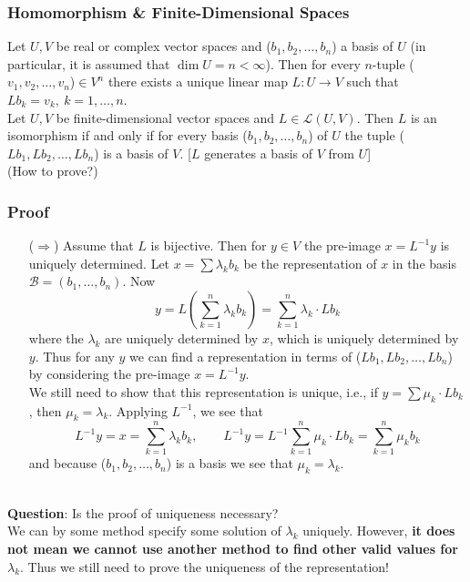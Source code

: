 \documentclass[12pt, t]{beamer}
\newcommand{\myseries}[2]{$#1_1,#1_2,\dots,#1_#2$}
\newcommand{\nullspace}{~\\[15pt]}
\begin{document}
\begin{frame}
    \frametitle{Homomorphism \& Finite-Dimensional Spaces}
    Let $U,V$ be real or complex vector spaces and (\myseries{b}{n}) a basis of $U$ (in particular, it is assumed that $\dim U=n<\infty$). Then for every $n$-tuple (\myseries{v}{n})$\in V^n$ there exists a unique linear map $L:U\to V$ such that $Lb_k=v_k,~k=1,\ldots,n.$
    \nullspace
    Let $U,V$ be finite-dimensional vector spaces and $L\in\mathcal{L}(U,V)$. Then $L$ is an isomorphism if and only if for every basis (\myseries{b}{n}) of $U$ the tuple (\myseries{Lb}{n}) is a basis of $V$. [$L$ generates a basis of $V$ from $U$]
    \nullspace
    (How to prove?)
\end{frame}

\begin{frame}
    \frametitle{Proof}
    \tiny
    \begin{itemize}
        \item[($\Rightarrow$)] Assume that $L$ is bijective. Then for $y\in V$ the pre-image $x=L^{-1}y$ is uniquely determined. Let $x=\sum\lambda_kb_k$ be the representation of $x$ in the basis $\mathcal{B}=(b_1,\ldots,b_n)$. Now
              \[y=L\left(\sum_{k=1}^{n}\lambda_kb_k\right)=\sum_{k=1}^{n}\lambda_k\cdot Lb_k\]
              where the $\lambda_k$ are uniquely determined by $x$, which is uniquely determined by $y$. Thus for any $y$ we can find a representation in terms of (\myseries{Lb}{n}) by considering the pre-image $x=L^{-1}y$.\\
              We still need to show that this representation is unique, i.e., if $y=\sum\mu_k\cdot Lb_k$, then $\mu_k=\lambda_k$. Applying $L^{-1}$, we see that
              \[L^{-1}y=x=\sum_{k=1}^{n}\lambda_kb_k,\qquad
                  L^{-1}y=L^{-1}\sum_{k=1}^{n}\mu_k\cdot Lb_k=\sum_{k=1}^{n}\mu_kb_k\]
              and because (\myseries{b}{n}) is a basis we see that $\mu_k=\lambda_k$.
    \end{itemize}
    \nullspace \small
    \textbf{Question}: Is the proof of uniqueness necessary?\\[9pt]
    \pause
    We can by some method specify some solution of $\lambda_k$ uniquely. However, \textbf{it does not mean we cannot use another method to find other valid values for $\lambda_k$}. Thus we still need to prove the uniqueness of the representation!
\end{frame}
\end{document}
